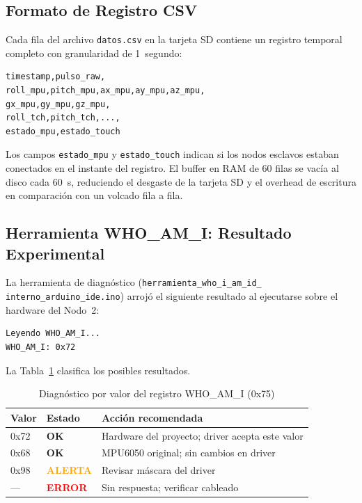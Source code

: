 \documentclass[10pt,twocolumn,a4paper]{article}
\begin{document}
\subsection{Formato de Registro CSV}

Cada fila del archivo \texttt{datos.csv} en la tarjeta SD contiene un
registro temporal completo con granularidad de 1~segundo:

\begin{lstlisting}[style=csrc, numbers=none,
  caption={Cabecera del archivo datos.csv en la tarjeta SD},
  label=lst:csv]
timestamp,pulso_raw,
roll_mpu,pitch_mpu,ax_mpu,ay_mpu,az_mpu,
gx_mpu,gy_mpu,gz_mpu,
roll_tch,pitch_tch,...,
estado_mpu,estado_touch
\end{lstlisting}

Los campos \texttt{estado\_mpu} y \texttt{estado\_touch} indican si los
nodos esclavos estaban conectados en el instante del registro. El buffer
en RAM de 60 filas se vacía al disco cada 60~s, reduciendo el desgaste
de la tarjeta SD y el overhead de escritura en comparación con un volcado
fila a fila.

\subsection{Herramienta WHO\_AM\_I: Resultado Experimental}

La herramienta de diagnóstico (\texttt{herramienta\_who\_i\_am\_id\_ interno\_arduino\_ide.ino}) arrojó el siguiente resultado al ejecutarse
sobre el hardware del Nodo~2:

\begin{lstlisting}[style=csrc, numbers=none,
  caption={Salida del Monitor Serie de la herramienta diagnóstica},
  label=lst:out_who]
Leyendo WHO_AM_I...
WHO_AM_I: 0x72
\end{lstlisting}

La Tabla~\ref{tab:who} clasifica los posibles resultados.

\begin{table}[H]
\centering
\caption{Diagnóstico por valor del registro WHO\_AM\_I (0x75)}
\label{tab:who}
\scriptsize
\begin{tabular}{p{0.9cm}p{0.9cm}p{4.0cm}}
\toprule
\textbf{Valor} & \textbf{Estado} & \textbf{Acción recomendada} \\
\midrule
0x72 & \textcolor{green!60!black}{\bfseries OK} & Hardware del proyecto; driver acepta este valor \\
0x68 & \textcolor{green!60!black}{\bfseries OK} & MPU6050 original; sin cambios en driver \\
0x98 & \textcolor{orange}{\bfseries ALERTA} & Revisar máscara del driver \\
--- & \textcolor{red}{\bfseries ERROR} & Sin respuesta; verificar cableado \\
\bottomrule
\end{tabular}
\end{table}
\end{document}
